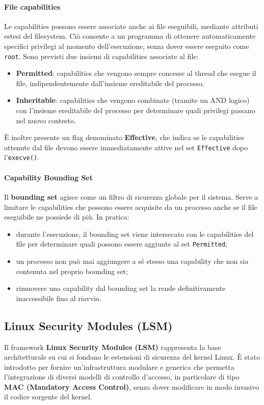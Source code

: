 \paragraph{File capabilities}
Le capabilities possono essere associate anche ai file eseguibili, mediante attributi estesi del filesystem.
Ciò consente a un programma di ottenere automaticamente specifici privilegi al momento dell’esecuzione, senza dover essere eseguito come \texttt{root}.
Sono previsti due insiemi di capabilities associate al file:
\begin{itemize}
  \item \textbf{Permitted}: capabilities che vengono sempre concesse al thread che esegue il file, indipendentemente dall’insieme ereditabile del processo.
  \item \textbf{Inheritable}: capabilities che vengono combinate (tramite un AND logico) con l’insieme ereditabile del processo per determinare quali privilegi passano nel nuovo contesto.
\end{itemize}
È inoltre presente un flag denominato \textbf{Effective}, che indica se le capabilities ottenute dal file devono essere immediatamente attive nel set \texttt{Effective} dopo l’\texttt{execve()}.


\paragraph{Capability Bounding Set}
Il \textbf{bounding set} agisce come un filtro di sicurezza globale per il sistema.
Serve a limitare le capabilities che possono essere acquisite da un processo anche se il file eseguibile ne possiede di più.
In pratica:
\begin{itemize}
  \item durante l’esecuzione, il bounding set viene intersecato con le capabilities del file per determinare quali possono essere aggiunte al set \texttt{Permitted};
  \item un processo non può mai aggiungere a sé stesso una capability che non sia contenuta nel proprio bounding set;
  \item rimuovere una capability dal bounding set la rende definitivamente inaccessibile fino al riavvio.
\end{itemize}

\subsection{Linux Security Modules (LSM)}
Il framework \textbf{Linux Security Modules (LSM)} rappresenta la base architetturale su cui si fondano le estensioni di sicurezza del kernel Linux.
È stato introdotto per fornire un’infrastruttura modulare e generica che permetta l’integrazione di diversi modelli di controllo d’accesso, in particolare di tipo \textbf{MAC (Mandatory Access Control)}, senza dover modificare in modo invasivo il codice sorgente del kernel.

